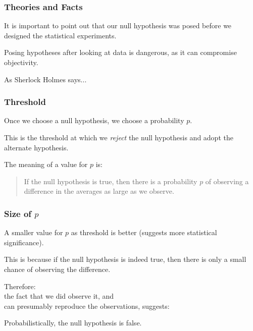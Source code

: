 \begin{frame}
\frametitle{Theories and Facts}
\begin{changemargin}{1cm}

It is important to point out that our null hypothesis was posed
before we designed the statistical experiments. 

Posing hypotheses
after looking at data is dangerous, as it 
can compromise objectivity.

As Sherlock Holmes says...

\end{changemargin}
\end{frame}


\begin{frame}
\frametitle{Threshold}
\begin{changemargin}{1cm}

Once we choose a null hypothesis,
we choose a probability $p$.

This is the threshold at which
we \emph{reject} the null hypothesis and adopt the alternate
hypothesis. 

The meaning of a value for $p$ is:
\begin{quote}
    If the null hypothesis is true, then
    there is a probability $p$ of observing a difference
    in the averages as large as we observe.
\end{quote}


\end{changemargin}
\end{frame}

\begin{frame}
\frametitle{Size of $p$}
\begin{changemargin}{1cm}

A smaller
value for $p$ as threshold is better (suggests more
statistical significance). 

This is because if the null hypothesis
is indeed true, then there is only a small chance of observing
the difference. 

Therefore:\\
\quad  the fact that we did observe it, and \\
\quad  can presumably reproduce
the observations, suggests:

Probabilistically, the null hypothesis is false.

\end{changemargin}
\end{frame}

